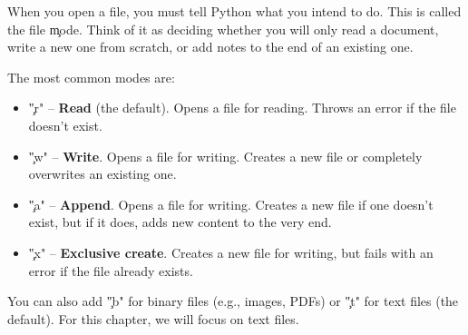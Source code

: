

When you open a file, you must tell Python what you intend to do. This is called the file \c{mode}. Think of it as deciding whether you will only read a document, write a new one from scratch, or add notes to the end of an existing one.

The most common modes are:
\begin{itemize}
  \item \c{"r"} -- \textbf{Read} (the default). Opens a file for reading. Throws an error if the file doesn't exist.
  \item \c{"w"} -- \textbf{Write}. Opens a file for writing. Creates a new file or completely overwrites an existing one.
  \item \c{"a"} -- \textbf{Append}. Opens a file for writing. Creates a new file if one doesn't exist, but if it does, adds new content to the very end.
  \item \c{"x"} -- \textbf{Exclusive create}. Creates a new file for writing, but fails with an error if the file already exists.
\end{itemize}
You can also add \c{"b"} for binary files (e.g., images, PDFs) or \c{"t"} for text files (the default). For this chapter, we will focus on text files.

